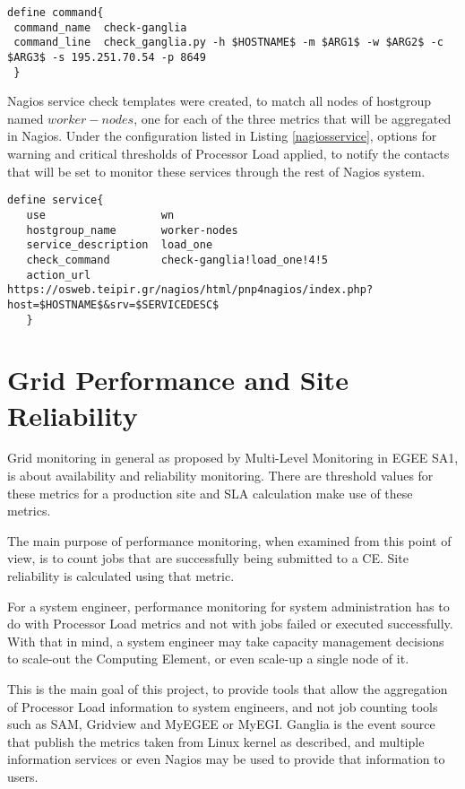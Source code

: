 \begin{lstlisting}[label=checkganglia]
define command{
 command_name  check-ganglia
 command_line  check_ganglia.py -h $HOSTNAME$ -m $ARG1$ -w $ARG2$ -c $ARG3$ -s 195.251.70.54 -p 8649
 }
\end{lstlisting}

Nagios service check templates were created, to match all nodes of hostgroup named $worker-nodes$, one for each of the three metrics that will be aggregated in Nagios. Under the configuration listed in Listing \ref{nagiosservice}, options for warning and critical thresholds of Processor Load applied, to notify the contacts that will be set to monitor these services through the rest of Nagios system.

\begin{lstlisting}[label=nagiosservice]
define service{
   use                  wn
   hostgroup_name       worker-nodes
   service_description  load_one
   check_command        check-ganglia!load_one!4!5
   action_url           https://osweb.teipir.gr/nagios/html/pnp4nagios/index.php?host=$HOSTNAME$&srv=$SERVICEDESC$
   }
\end{lstlisting}

\section{Grid Performance and Site Reliability}

Grid monitoring in general as proposed by Multi-Level Monitoring in EGEE SA1, is about availability and reliability monitoring. There are threshold values for these metrics for a production site and SLA calculation make use of these metrics.

The main purpose of performance monitoring, when examined from this point of view, is to count jobs that are successfully being submitted to a CE. Site reliability is calculated using that metric.

For a system engineer, performance monitoring for system administration has to do with Processor Load metrics and not with jobs failed or executed successfully. With that in mind, a system engineer may take capacity management decisions to scale-out the Computing Element, or even scale-up a single node of it.

This is the main goal of this project, to provide tools that allow the aggregation of Processor Load information to system engineers, and not job counting tools such as SAM, Gridview and MyEGEE or MyEGI. Ganglia is the event source that publish the metrics taken from Linux kernel as described, and multiple information services or even Nagios may be used to provide that information to users.

